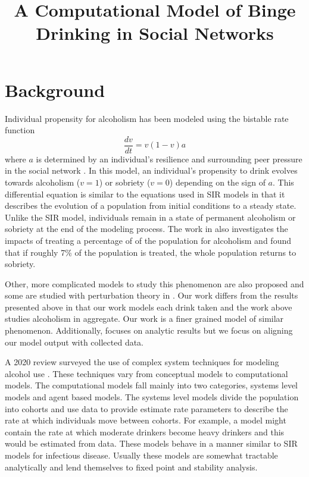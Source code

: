 \documentclass{journal}
\theoremstyle{definition}
\begin{document}
\title{A Computational Model of Binge Drinking in Social Networks}
\maketitle

\section*{Background}

Individual propensity for alcoholism has been modeled using the bistable rate function
\[
\frac{dv}{dt} = v(1-v)a
\]
where $a$ is determined by an individual's resilience and surrounding peer pressure in the social network  \cite{Braun2010, Braun2006}. In this model, an individual's propensity to drink evolves towards alcoholism ($v=1$) or sobriety ($v=0$) depending on the sign of $a$. This differential equation is similar to the equations used in SIR models in that it describes the evolution of a population from initial conditions to a steady state. Unlike the SIR model, individuals remain in a state of permanent alcoholism or sobriety at the end of the modeling process. The work in \cite{Braun2006} also investigates the impacts of treating a percentage of of the population for alcoholism and found that if roughly 7\% of the population is treated, the whole population returns to sobriety.

Other, more complicated models to study this phenomenon are also proposed and some are studied with perturbation theory in \cite{Braun2010}. Our work differs from the results presented above in that our work models each drink taken and the work above studies alcoholism in aggregate. Our work is a finer grained model of similar phenomenon. Additionally, \cite{Braun2010} focuses on analytic results but we focus on aligning our model output with collected data.

A 2020 review surveyed the use of complex system techniques for modeling alcohol use \cite{Mcgill2020}. These techniques vary from conceptual models to computational models. The computational models fall mainly into two categories, systems level models and agent based models. The systems level models divide the population into cohorts and use data to provide estimate rate parameters to describe the rate at which individuals move between cohorts. For example, a model might contain the rate at which moderate drinkers become heavy drinkers and this would be estimated from data. These models behave in a manner similar to SIR models for infectious disease. Usually these models are somewhat tractable analytically and lend themselves to fixed point and stability analysis.
\end{document}
